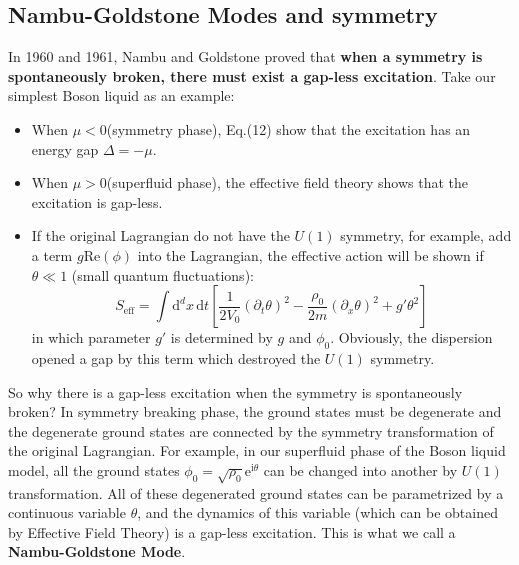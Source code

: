 \documentclass{article}
\newcommand{\im}{\mathrm{i}}
\newcommand{\ep}{\mathrm{e}}
\newcommand{\ud}{\mathrm{d}}
\begin{document}
\subsection{Nambu-Goldstone Modes and symmetry}
In 1960 and 1961, Nambu and Goldstone proved that {\bf{when a symmetry is spontaneously broken, there must exist a gap-less excitation}}. Take our simplest Boson liquid as an example:
\begin{itemize}
\item When $\mu < 0$(symmetry phase), Eq.(12) show that the excitation has an energy gap $\Delta = -\mu$.
\item When $\mu > 0$(superfluid phase), the effective field theory shows that the excitation is gap-less.
\item If the original Lagrangian do not have the $U(1)$ symmetry, for example, add a term $g\mathrm{Re}(\phi)$ into the Lagrangian, the effective action will be shown if $\theta\ll 1$ (small quantum fluctuations):
$$
S_{\mathrm{eff}} = \int \ud^dx\,\ud t \left[\frac{1}{2V_0}(\partial_t \theta)^2 - \frac{\rho_0}{2m}(\partial_x\theta)^2+g'\theta^2\right]
$$
in which parameter $g'$ is determined by $g$ and $\phi_0$. Obviously, the dispersion opened a gap by this term which destroyed the $U(1)$ symmetry.
\end{itemize}

So why there is a gap-less excitation when the symmetry is spontaneously broken? In symmetry breaking phase, the ground states must be degenerate and the degenerate ground states are connected by the symmetry transformation of the original Lagrangian. For example, in our superfluid phase of the Boson liquid model, all the ground states $\phi_0 = \sqrt{\rho_0}\ep^{\im\theta}$ can be changed into another by $U(1)$ transformation. All of these degenerated ground states can be parametrized by a continuous variable $\theta$, and the dynamics of this variable (which can be obtained by Effective Field Theory) is a gap-less excitation. This is what we call a {\bf{Nambu-Goldstone Mode}}.
\end{document}
